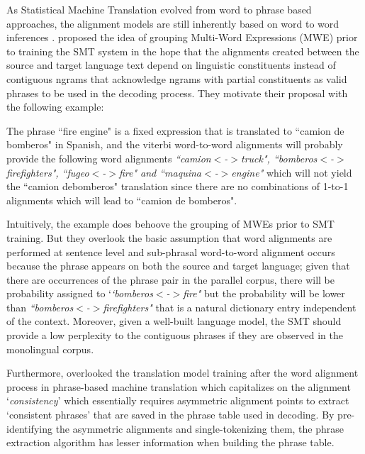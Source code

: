 As Statistical Machine Translation evolved from word to phrase based approaches, the alignment models are still inherently based on word to word inferences \citep{vogel1996hmm,och2003systematic}. \cite{lambert2006grouping} proposed the idea of grouping  Multi-Word Expressions (MWE) prior to training the SMT system in the hope that the alignments created between the source and target language text depend on linguistic constituents instead of contiguous ngrams that acknowledge ngrams with partial constituents as valid phrases to be used in the decoding process. They motivate their proposal with the following example:


The phrase ``fire engine" is a fixed expression that is translated to ``camion de bomberos" in Spanish, and the viterbi word-to-word alignments will probably provide the following word alignments \emph{``camion$<$-$>$truck", ``bomberos$<$-$>$firefighters", ``fugeo$<$-$>$fire" and ``maquina$<$-$>$engine"} which will not yield the ``camion debomberos" translation since there are no combinations of 1-to-1 alignments which will lead to ``camion de bomberos". 

Intuitively, the example does behoove the grouping of MWEs prior to SMT training. But they overlook the basic assumption that word alignments are performed at sentence level and sub-phrasal word-to-word alignment occurs because the phrase appears on both the source and target language; given that there are occurrences of the phrase pair in the parallel corpus, there will be probability assigned to `\emph{`bomberos$<$-$>$fire"} but the probability will be lower than \emph{``bomberos$<$-$>$firefighters"} that is a natural dictionary entry independent of the context. Moreover, given a well-built language model, the SMT should provide a low perplexity to the contiguous phrases if they are observed in the monolingual corpus. 

Furthermore, \cite{lambert2006grouping} overlooked the translation model training after the word alignment process in phrase-based machine translation which capitalizes on the alignment `\emph{consistency}' which essentially requires asymmetric alignment points to extract `consistent phrases' that are saved in the phrase table used in decoding. By pre-identifying the asymmetric alignments and single-tokenizing them, the phrase extraction algorithm has lesser information when building the phrase table. 

